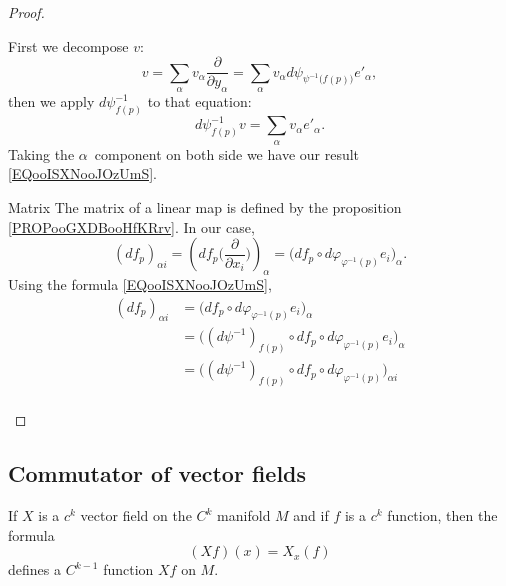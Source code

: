\begin{proof}
\begin{subproof}
            First we decompose \( v\):
            \begin{equation}
                v=\sum_{\alpha}v_{\alpha}\frac{ \partial  }{ \partial y_{\alpha} }=\sum_{\alpha}v_{\alpha}d\psi_{\psi^{-1}\big( f(p) \big)}e'_{\alpha},
            \end{equation}
            then we apply \( d\psi^{-1}_{f(p)}\) to that equation:
            \begin{equation}
                d\psi^{-1}_{f(p)}v=\sum_{\alpha}v_{\alpha}e'_{\alpha}.
            \end{equation}
            Taking the \( \alpha\)\th\ component on both side we have our result \eqref{EQooISXNooJOzUmS}.
        \item[Matrix]
            The matrix of a linear map is defined by the proposition \ref{PROPooGXDBooHfKRrv}. In our case,
            \begin{equation}
                    (df_p)_{\alpha i}=\left( df_p\big( \frac{ \partial  }{ \partial x_i } \big) \right)_{\alpha} =\Big( df_p\circ d\varphi_{\varphi^{-1}(p)}e_i \Big)_{\alpha}.
            \end{equation}
            Using the formula \eqref{EQooISXNooJOzUmS},
            \begin{subequations}
                \begin{align}
                    (df_p)_{\alpha i}&=\Big( df_p\circ d\varphi_{\varphi^{-1}(p)}e_i \Big)_{\alpha}\\
                    &=\big( (d\psi^{-1})_{f(p)}\circ df_p\circ d\varphi_{\varphi^{-1}(p)}e_i \big)_{\alpha}\\
                    &=\big( (d\psi^{-1})_{f(p)}\circ df_p\circ d\varphi_{\varphi^{-1}(p)} \big)_{\alpha i}\\
                \end{align}
            \end{subequations}
    \end{subproof}
\end{proof}

\subsection{Commutator of vector fields}

\begin{lemma}       \label{LEMooPSWEooVKLWMQ}
    If \( X\) is a \( c^k\) vector field on the \( C^k\) manifold \( M\) and if \( f\) is a \( c^k\) function, then the formula
    \begin{equation}
        (Xf)(x)=X_x(f)
    \end{equation}
    defines a \( C^{k-1}\) function \( Xf\) on \( M\).
\end{lemma}


